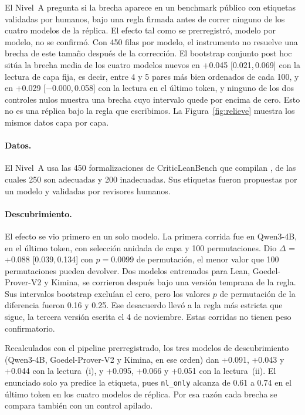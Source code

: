 \documentclass[10pt]{article}
\newcommand{\vr}[1]{\texttt{#1}}
\newcommand{\D}{\Delta}
\newcommand{\ic}[2]{[#1,\,#2]}
\begin{document}
El Nivel~A pregunta si la brecha aparece en un benchmark público con etiquetas validadas por humanos, bajo una regla
firmada antes de correr ninguno de los cuatro modelos de la réplica.
El efecto tal como se prerregistró, modelo por modelo, no se confirmó. Con 450 filas por modelo, el instrumento no
resuelve una brecha de este tamaño después de la corrección. El bootstrap conjunto post hoc sitúa la brecha media
de los cuatro modelos nuevos en +0.045 \ic{0.021}{0.069} con la lectura de capa fija, es decir, entre 4 y 5 pares más
bien ordenados de cada 100, y en +0.029
\ic{−0.000}{0.058} con la lectura en el último token, y ninguno de los dos controles nulos muestra una brecha cuyo intervalo quede por encima de cero. Esto no es una réplica bajo la regla que escribimos.
La Figura~\ref{fig:relieve} muestra los mismos datos capa por capa.

\paragraph{Datos.}
El Nivel~A usa las 450 formalizaciones de CriticLeanBench que compilan \citep{criticlean}, de las cuales 250 son
adecuadas y 200 inadecuadas. Sus etiquetas fueron propuestas por un modelo y validadas por revisores humanos.

\paragraph{Descubrimiento.}
El efecto se vio primero en un solo modelo. La primera corrida fue en Qwen3-4B, en el último token, con selección
anidada de capa y 100 permutaciones. Dio
$\D$ = +0.088 \ic{0.039}{0.134} con $p = 0.0099$ de permutación, el menor valor que 100 permutaciones pueden devolver. Dos
modelos entrenados para Lean, Goedel-Prover-V2 y Kimina, se corrieron después bajo una versión temprana de la regla. Sus intervalos
bootstrap excluían el cero, pero los valores $p$ de permutación de la diferencia fueron 0.16 y 0.25. Ese desacuerdo
llevó a la regla más estricta que sigue, la tercera versión escrita el 4 de noviembre. Estas corridas no tienen peso
confirmatorio.

Recalculados con el pipeline prerregistrado, los tres modelos de descubrimiento (Qwen3-4B, Goedel-Prover-V2 y Kimina, en ese orden) dan +0.091, +0.043 y +0.044 con la
lectura~(i), y +0.095, +0.066 y +0.051 con la lectura~(ii). El enunciado solo ya predice la etiqueta, pues
\vr{nl\_only} alcanza de 0.61 a 0.74 en el último token en los cuatro modelos de réplica. Por esa razón cada brecha se compara también
con un control apilado.
\end{document}
